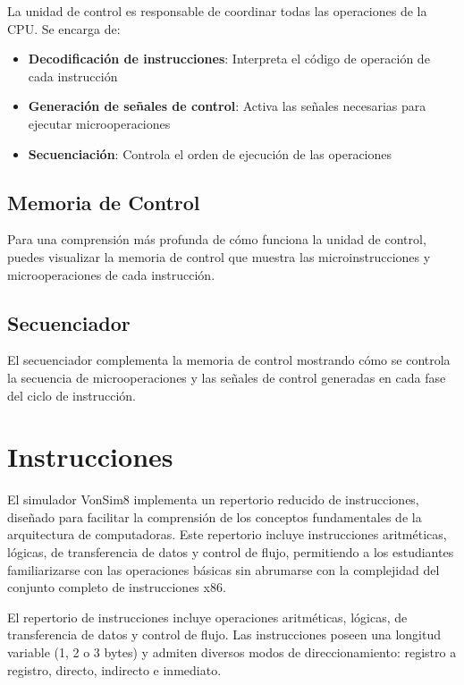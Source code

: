 \documentclass[12pt,oneside]{templates/unerthesis}
\providecommand{\tightlist}{%
  \setlength{\itemsep}{0pt}\setlength{\parskip}{0pt}}
\begin{document}
La unidad de control es responsable de coordinar todas las operaciones de la CPU. Se encarga de:

\begin{itemize}
\tightlist
\item
  \textbf{Decodificación de instrucciones}: Interpreta el código de operación de cada instrucción
\item
  \textbf{Generación de señales de control}: Activa las señales necesarias para ejecutar microoperaciones
\item
  \textbf{Secuenciación}: Controla el orden de ejecución de las operaciones
\end{itemize}

\hypertarget{memoria-de-control}{%
\subsection{Memoria de Control}\label{memoria-de-control}}

Para una comprensión más profunda de cómo funciona la unidad de control, puedes visualizar la memoria de control que muestra las microinstrucciones y microoperaciones de cada instrucción.

\hypertarget{secuenciador}{%
\subsection{Secuenciador}\label{secuenciador}}

El secuenciador complementa la memoria de control mostrando cómo se controla la secuencia de microoperaciones y las señales de control generadas en cada fase del ciclo de instrucción.

\hypertarget{instrucciones}{%
\section{Instrucciones}\label{instrucciones}}

El simulador VonSim8 implementa un repertorio reducido de instrucciones, diseñado para facilitar la comprensión de los conceptos fundamentales de la arquitectura de computadoras. Este repertorio incluye instrucciones aritméticas, lógicas, de transferencia de datos y control de flujo, permitiendo a los estudiantes familiarizarse con las operaciones básicas sin abrumarse con la complejidad del conjunto completo de instrucciones x86.

El repertorio de instrucciones incluye operaciones aritméticas, lógicas, de transferencia de datos y control de flujo. Las instrucciones poseen una longitud variable (1, 2 o 3 bytes) y admiten diversos modos de direccionamiento: registro a registro, directo, indirecto e inmediato.
\end{document}
